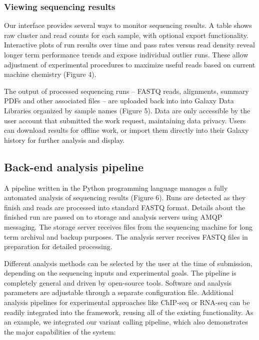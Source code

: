 \documentclass[10pt]{bmc_article}
\newenvironment{bmcformat}{\begin{raggedright}\baselineskip20pt\sloppy\setboolean{publ}{false}}{\end{raggedright}\baselineskip20pt\sloppy}
\begin{document}
\begin{bmcformat}
\subsubsection*{Viewing sequencing results}

Our interface provides several ways to monitor sequencing results.
A table shows raw cluster and read counts for each sample, with
optional export functionality.  Interactive plots of run results over
time and pass rates versus read density reveal longer term performance
trends and expose individual outlier runs. These allow adjustment of
experimental procedures to maximize useful reads based on current
machine chemistry (Figure 4).

The output of processed sequencing runs -- FASTQ reads, alignments,
summary PDFs and other associated files -- are uploaded back
into into Galaxy Data Libraries organized by sample names (Figure
5). Data are only accessible by the user account that submitted the
work request, maintaining data privacy. Users can download results for
offline work, or import them directly into their Galaxy history for
further analysis and display.

\subsection*{Back-end analysis pipeline}

A pipeline written in the Python programming language manages a fully
automated analysis of sequencing results (Figure 6). Runs are detected
as they finish and reads are processed into standard FASTQ
format. Details about the finished run are passed on to storage and
analysis servers using AMQP messaging. The storage server receives
files from the sequencing machine for long term archival and backup
purposes. The analysis server receives FASTQ files in preparation for
detailed processing.

Different analysis methods can be selected by the user at the time of
submission, depending on the sequencing inputs and experimental
goals. The pipeline is completely general and driven by open-source
tools. Software and analysis parameters are adjustable through a
separate configuration file. Additional analysis pipelines for
experimental approaches like ChIP-seq or RNA-seq can be readily
integrated into the framework, reusing all of the existing
functionality. As an example, we integrated our variant calling pipeline, 
which also demonstrates the major capabilities of the system:


\end{bmcformat}
\end{document}
